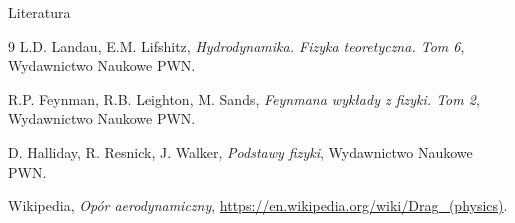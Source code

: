 \documentclass[10pt, aspectratio=43]{beamer}
\begin{document}
\begin{frame}{Literatura}
    \begin{thebibliography}{9}
        L.D. Landau, E.M. Lifshitz,
        \textit{Hydrodynamika. Fizyka teoretyczna. Tom 6},
        Wydawnictwo Naukowe PWN.
        
        R.P. Feynman, R.B. Leighton, M. Sands,
        \textit{Feynmana wykłady z fizyki. Tom 2},
        Wydawnictwo Naukowe PWN.

        D. Halliday, R. Resnick, J. Walker,
        \textit{Podstawy fizyki},
        Wydawnictwo Naukowe PWN.

        Wikipedia,
        \textit{Opór aerodynamiczny},
        \url{https://en.wikipedia.org/wiki/Drag_(physics)}.
    \end{thebibliography}
\end{frame}
\end{document}
